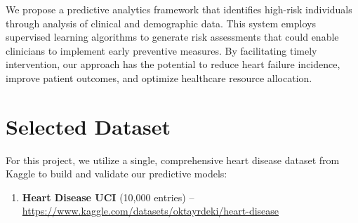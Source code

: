\documentclass[11pt,a4paper]{article}
\begin{document}
We propose a predictive analytics framework that identifies high-risk
individuals through analysis of clinical and demographic data.
This system employs supervised learning algorithms to generate risk
assessments that could enable clinicians to implement early preventive measures.
By facilitating timely intervention, our approach has the potential to
reduce heart failure incidence, improve patient outcomes, and optimize healthcare resource allocation.


\section{Selected Dataset}

\begin{tcolorbox}[notebox={Dataset Information}]
    For this project, we utilize a single, comprehensive heart disease dataset from Kaggle to build and validate our predictive models:
    \vspace{-0.25cm}
    \begin{enumerate}[leftmargin=*, itemsep=2pt, parsep=0pt]
        \item \textbf{Heart Disease UCI} (10,000 entries) –
              \url{https://www.kaggle.com/datasets/oktayrdeki/heart-disease}
    \end{enumerate}
\end{tcolorbox}
\end{document}
